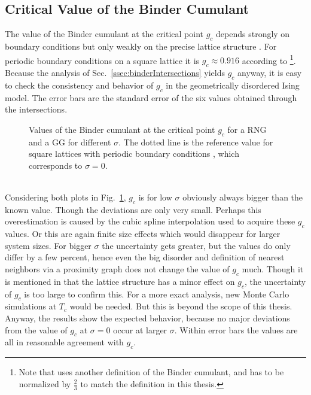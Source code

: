 \subsection{Critical Value of the Binder Cumulant}
    The value of the Binder cumulant at the critical point \(g_c\)
    depends strongly on boundary conditions but only weakly on the precise lattice
    structure \cite{BinderValue}. For periodic boundary conditions on a
    square lattice it is \(g_c \approx 0.916\) according to \cite{BinderValue}
        \footnote{Note that \cite{BinderValue} uses another definition of
            the Binder cumulant, and has to be normalized by \(\frac{2}{3}\)
            to match the definition in this thesis.}.
    Because the analysis of Sec.\ \ref{ssec:binderIntersections}
    yields \(g_c\) anyway, it is easy to check the consistency and
    behavior of \(g_c\) in the geometrically disordered Ising model.
    The error bars are the standard error of the six values obtained
    through the intersections.\\
    \begin{figure}[htbp]
        \centering
        \caption[Values of the Binder Cumulant at the Critical Point $g_c$]
        {
            Values of the Binder cumulant at the critical point \(g_c\)
            for
             a RNG and
             a GG for different \(\sigma\).
            The dotted line is the reference value for square lattices
            with periodic boundary conditions \cite{BinderValue}, which
            corresponds to \(\sigma = 0\).
        }
        \label{fig:TcG}
    \end{figure}\\
    Considering both plots in Fig.\ \ref{fig:TcG}, \(g_c\) is for low
    \(\sigma\) obviously always bigger than the known value. Though the
    deviations are only very small. Perhaps this overestimation is caused
    by the cubic spline interpolation used to acquire these \(g_c\) values.
    Or this are again finite size effects which would disappear for
    larger system sizes.
    For bigger \(\sigma\) the uncertainty gets greater, but the values
    do only differ by a few percent, hence even the big disorder and
    definition of nearest neighbors via a proximity graph does not change
    the value of \(g_c\) much. Though it is mentioned in \cite{BinderValue} that the
    lattice structure has a minor effect on \(g_c\), the uncertainty of
    \(g_c\) is too large to confirm this. For a more exact analysis, new
    Monte Carlo simulations at \(T_c\) would be needed. But this is
    beyond the scope of this thesis. Anyway, the results show the expected
    behavior, because no major deviations from the value of \(g_c\) at
    \(\sigma = 0\) occur at larger \(\sigma\). Within error bars the
    values are all in reasonable agreement with \(g_c\).
